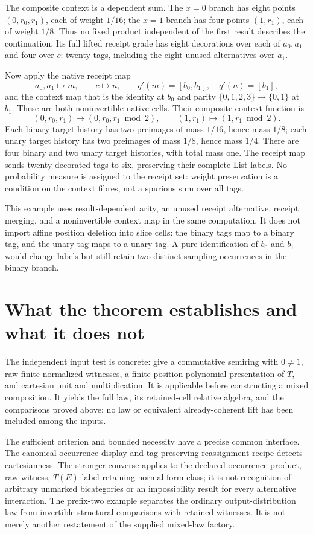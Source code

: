 \documentclass[11pt,a4paper]{article}
\theoremstyle{definition}
\begin{document}
The composite context is a dependent sum. The $x=0$ branch has eight
points $(0,r_0,r_1)$, each of weight $1/16$; the $x=1$ branch has four
points $(1,r_1)$, each of weight $1/8$. Thus no fixed product independent
of the first result describes the continuation. Its full lifted receipt
grade has eight decorations over each of $a_0,a_1$ and four over $c$:
twenty tags, including the eight unused alternatives over $a_1$.

Now apply the native receipt map
\[
 a_0,a_1\longmapsto m,\qquad c\longmapsto n,
 \qquad q'(m)=[b_0,b_1],\quad q'(n)=[b_1],
\]
and the context map that is the identity at $b_0$ and parity
$\{0,1,2,3\}\to\{0,1\}$ at $b_1$. These are both noninvertible
native cells. Their composite context function is
\[
 (0,r_0,r_1)\longmapsto(0,r_0,r_1\bmod2),\qquad
 (1,r_1)\longmapsto(1,r_1\bmod2).
\]
Each binary target history has two preimages of mass $1/16$, hence mass
$1/8$; each unary target history has two preimages of mass $1/8$, hence
mass $1/4$. There are four binary and two unary target histories, with
total mass one. The receipt map sends twenty decorated tags to six,
preserving their complete List labels. No probability measure is assigned
to the receipt set: weight preservation is a condition on the context
fibres, not a spurious sum over all tags.

This example uses result-dependent arity, an unused receipt alternative,
receipt merging, and a noninvertible context map in the same computation.
It does not import affine position deletion into slice cells: the binary
tags map to a binary tag, and the unary tag maps to a unary tag. A pure
identification of $b_0$ and $b_1$ would change labels but still retain two
distinct sampling occurrences in the binary branch.

\section{What the theorem establishes and what it does not}\label{sec:verdict}

The independent input test is concrete: give a commutative semiring with
$0\ne1$, raw finite normalized witnesses, a finite-position polynomial
presentation of $T$, and cartesian unit and multiplication. It is applicable
before constructing a mixed composition. It yields the full law, its
retained-cell relative algebra, and the comparisons proved above; no law
or equivalent already-coherent lift has been included among the inputs.

The sufficient criterion and bounded necessity have a precise common
interface. The canonical occurrence-display and tag-preserving reassignment
recipe detects cartesianness. The stronger converse applies to the declared
occurrence-product, raw-witness, $T(E)$-label-retaining normal-form class;
it is not recognition of arbitrary unmarked bicategories or an impossibility
result for every alternative interaction. The prefix-two example separates
the ordinary output-distribution law from invertible structural comparisons
with retained witnesses. It is not merely another restatement of the supplied
mixed-law factory.
\end{document}
